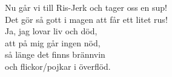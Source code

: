 \par
\vspace{10pt}
Nu går vi till Ris-Jerk och tager oss en sup!\\
Det gör så gott i magen att får ett litet rus!\\
\revrpt Ja, jag lovar liv och död,\\
att på mig går ingen nöd,\\
så länge det finns brännvin\\
och flickor/pojkar i överflöd.\rpt
